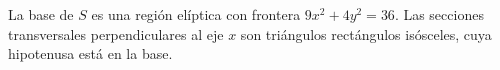 \item La base de $S$ es una región elíptica con frontera $9x^2 + 4y^2 = 36$. Las secciones transversales perpendiculares al eje $x$ son triángulos rectángulos isósceles, cuya hipotenusa está en la base.
